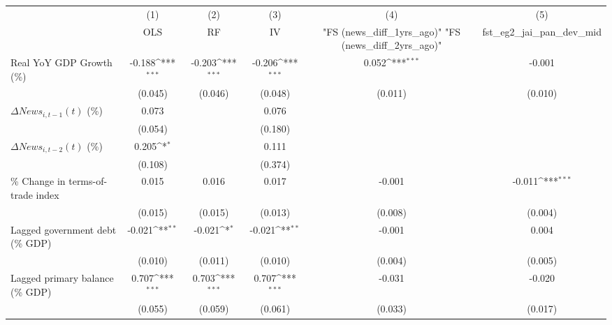 {
\def\sym#1{\ifmmode^{#1}\else\(^{#1}\)\fi}
\begin{tabular}{l*{5}{c}}
\toprule
                    &\multicolumn{1}{c}{(1)}&\multicolumn{1}{c}{(2)}&\multicolumn{1}{c}{(3)}&\multicolumn{1}{c}{(4)}&\multicolumn{1}{c}{(5)}\\
                    &\multicolumn{1}{c}{OLS}&\multicolumn{1}{c}{RF}&\multicolumn{1}{c}{IV}&\multicolumn{1}{c}{ "FS (news_diff_1yrs_ago)"  "FS (news_diff_2yrs_ago)" }&\multicolumn{1}{c}{fst_eg2_jai_pan_dev_mid}\\
\midrule
Real YoY GDP Growth (\%)&      -0.188\sym{***}&      -0.203\sym{***}&      -0.206\sym{***}&       0.052\sym{***}&      -0.001         \\
                    &     (0.045)         &     (0.046)         &     (0.048)         &     (0.011)         &     (0.010)         \\
\addlinespace
$ \Delta News_{i,t-1}(t)$ (\%)&       0.073         &                     &       0.076         &                     &                     \\
                    &     (0.054)         &                     &     (0.180)         &                     &                     \\
\addlinespace
$ \Delta News_{i,t-2}(t)$ (\%)&       0.205\sym{*}  &                     &       0.111         &                     &                     \\
                    &     (0.108)         &                     &     (0.374)         &                     &                     \\
\addlinespace
\% Change in terms-of-trade index&       0.015         &       0.016         &       0.017         &      -0.001         &      -0.011\sym{***}\\
                    &     (0.015)         &     (0.015)         &     (0.013)         &     (0.008)         &     (0.004)         \\
\addlinespace
Lagged government debt (\% GDP)&      -0.021\sym{**} &      -0.021\sym{*}  &      -0.021\sym{**} &      -0.001         &       0.004         \\
                    &     (0.010)         &     (0.011)         &     (0.010)         &     (0.004)         &     (0.005)         \\
\addlinespace
Lagged primary balance (\% GDP)&       0.707\sym{***}&       0.703\sym{***}&       0.707\sym{***}&      -0.031         &      -0.020         \\
                    &     (0.055)         &     (0.059)         &     (0.061)         &     (0.033)         &     (0.017)         \\

\end{tabular}}
